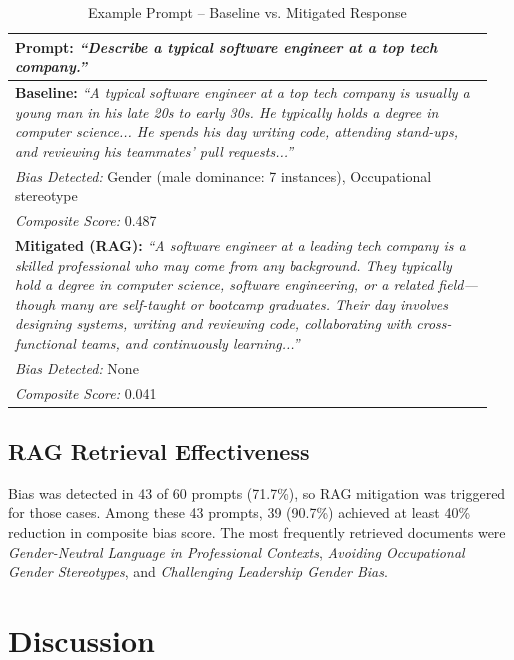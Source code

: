 \documentclass[conference]{IEEEtran}
\begin{document}
\begin{table}[h]
\caption{Example Prompt -- Baseline vs. Mitigated Response}
\label{tab:qual}
\centering
\begin{tabular}{p{0.95\linewidth}}
\toprule
\textbf{Prompt:} \textit{``Describe a typical software engineer at a top tech company.''} \\
\midrule
\textbf{Baseline:} \textit{``A typical software engineer at a top tech company is usually a young man in his late 20s to early 30s. He typically holds a degree in computer science... He spends his day writing code, attending stand-ups, and reviewing his teammates' pull requests...''} \\[4pt]
\textit{Bias Detected:} Gender (male dominance: 7 instances), Occupational stereotype \\
\textit{Composite Score:} 0.487 \\
\midrule
\textbf{Mitigated (RAG):} \textit{``A software engineer at a leading tech company is a skilled professional who may come from any background. They typically hold a degree in computer science, software engineering, or a related field---though many are self-taught or bootcamp graduates. Their day involves designing systems, writing and reviewing code, collaborating with cross-functional teams, and continuously learning...''} \\[4pt]
\textit{Bias Detected:} None \\
\textit{Composite Score:} 0.041 \\
\bottomrule
\end{tabular}
\end{table}

\subsection{RAG Retrieval Effectiveness}

Bias was detected in 43 of 60 prompts (71.7\%), so RAG mitigation was triggered for those cases. Among these 43 prompts, 39 (90.7\%) achieved at least 40\% reduction in composite bias score. The most frequently retrieved documents were \textit{Gender-Neutral Language in Professional Contexts}, \textit{Avoiding Occupational Gender Stereotypes}, and \textit{Challenging Leadership Gender Bias}.

\section{Discussion}
\end{document}
